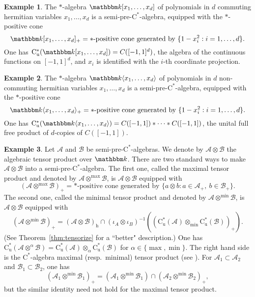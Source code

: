 \documentclass[12pt]{amsart}
\theoremstyle{definition}
\newtheorem{exa}{Example}
\begin{document}
\begin{exa}\label{exa:cp}
The $*$-algebra ${{\mathbbm k}}[x_1,\ldots,x_d]$ of polynomials in
$d$ commuting hermitian variables $x_1,\ldots,x_d$ is
a {semi-pre-$\mathrm{C}^*$-alge\-bra\xspace}, equipped with the $*$-positive cone
\[
{{\mathbbm k}}[x_1,\ldots,x_d]_+=\mbox{$*$-positive cone generated by }\{ 1 - x_i^2 : i=1,\ldots,d\}.
\]
One has $\mathrm{C}^*_{\mathrm{u}}({{\mathbbm k}}[x_1,\ldots,x_d])=C([-1,1]^d)$,
the algebra of the continuous functions on $[-1,1]^d$, and $x_i$ is identified
with the $i$-th coordinate projection.
\end{exa}

\begin{exa}\label{exa:ncp}
The $*$-algebra ${{\mathbbm k}}\langle x_1,\ldots,x_d\rangle$ of polynomials in
$d$ non-commuting hermitian variables $x_1,\ldots,x_d$ is
a {semi-pre-$\mathrm{C}^*$-alge\-bra\xspace}, equipped with the $*$-positive cone
\[
{{\mathbbm k}}\langle x_1,\ldots,x_d\rangle_+=\mbox{$*$-positive cone generated by }\{ 1 - x_i^2 : i=1,\ldots,d\}.
\]
One has $\mathrm{C}^*_{\mathrm{u}}({{\mathbbm k}}\langle x_1,\ldots,x_d\rangle)=C([-1,1])*\cdots*C([-1,1])$,
the unital full free product of $d$-copies of $C([-1,1])$.
\end{exa}

\begin{exa}\label{exa:tensor}
Let ${{\mathcal A}}$ and ${{\mathcal B}}$ be {semi-pre-$\mathrm{C}^*$-alge\-bra\xspace}{}s. We denote by
${{\mathcal A}}\otimes{{\mathcal B}}$ the algebraic tensor product over ${{\mathbbm k}}$.
There are two standard ways to make ${{\mathcal A}}\otimes{{\mathcal B}}$ into a {semi-pre-$\mathrm{C}^*$-alge\-bra\xspace}.
The first one, called the maximal tensor product and denoted by ${{\mathcal A}}\otimes^{\max}{{\mathcal B}}$,
is ${{\mathcal A}}\otimes{{\mathcal B}}$ equipped with
\[
({{\mathcal A}}\otimes^{\max}{{\mathcal B}})_+=\mbox{$*$-positive cone generated by }\{ a\otimes b : a\in{{\mathcal A}}_+,\ b\in{{\mathcal B}}_+\}.
\]
The second one, called the minimal tensor product and denoted by ${{\mathcal A}}\otimes^{\min}{{\mathcal B}}$,
is ${{\mathcal A}}\otimes{{\mathcal B}}$ equipped with
\[
({{\mathcal A}}\otimes^{\min}{{\mathcal B}})_+=({{\mathcal A}}\otimes{{\mathcal B}})_{\mathrm{h}} \cap
 (\iota_A\otimes\iota_B)^{-1}((\mathrm{C}^*_{\mathrm{u}}({{\mathcal A}})\otimes_{\min}\mathrm{C}^*_{\mathrm{u}}({{\mathcal B}}))_+).
\]
(See Theorem~\ref{thm:tensorize} for a ``better" description.)
One has $\mathrm{C}^*_{\mathrm{u}}({{\mathcal A}}\otimes^{\alpha}{{\mathcal B}})=\mathrm{C}^*_{\mathrm{u}}({{\mathcal A}})\otimes_{\alpha}\mathrm{C}^*_{\mathrm{u}}({{\mathcal B}})$
for $\alpha\in\{\max,\min\}$. The right hand side is
the {$\mathrm{C}^*$-alge\-bra\xspace} maximal (resp.\ minimal) tensor product (see \cite{bo,pisier}).
For ${{\mathcal A}}_1\subset{{\mathcal A}}_2$ and ${{\mathcal B}}_1\subset{{\mathcal B}}_2$, one has
\[
({{\mathcal A}}_1\otimes^{\min}{{\mathcal B}}_1)_+ = ({{\mathcal A}}_1\otimes^{\min}{{\mathcal B}}_1) \cap ({{\mathcal A}}_2\otimes^{\min}{{\mathcal B}}_2)_+,
\]
but the similar identity need not hold for the maximal tensor product.
\end{exa}
\end{document}
